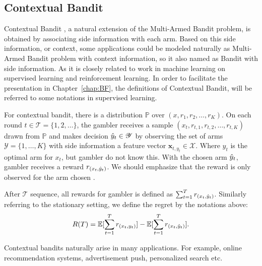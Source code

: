 \subsection{Contextual Bandit}
\label{subsec:contextual}

Contextual Bandit \cite{agrawal2012thompson,may2012optimistic}, a natural extension of the Multi-Armed Bandit problem, is obtained by associating side information with each arm. Based on this side information, or context, some applications could be modeled naturally as Multi-Armed Bandit problem with context information, so it also named as Bandit with side information. As it is closely related to work in machine learning on supervised learning and reinforcement learning. In order to facilitate the presentation in Chapter~\ref{chap:BF}, the definitions of Contextual Bandit, will be referred to some notations in supervised learning.

For contextual bandit, there is a distribution $\mathbb{P}$ over $(x, r_1, r_2,\dots,r_K)$. On each round $t\in \mathscr{T}=\{1, 2, \dots\}$, the gambler receives a sample $(x_t, r_{t,1},r_{t,2},\dots, r_{t,K})$ drawn from $\mathbb{P}$ and makes decision $\hat{y}_t \in \mathscr{Y}$ by observing the set of arms $\mathscr{Y} = \{1,\dots,K\}$ with side information a feature vector $\mathbf{x}_{t,y_t} \in \mathscr{X}$. Where $y_t$ is the optimal arm for $x_t$, but gambler do not know this. With the chosen arm $\hat{y}_t$, gambler receives a  reward $r_{(x_t,\hat{y}_t)}$. We should emphasize that the reward is only observed for the arm chosen . 

After $\mathscr{T}$ sequence, all rewards for gambler is defined as $\sum_{t=1}^{T}r_{(x_t,\hat{y}_t)}$. Similarly referring to the stationary setting, we define the regret by the notations above:
\[R(T) = \mathbb{E}[\sum_{t=1}^{T}r_{(x_t,y_t)}] - \mathbb{E}[\sum_{t=1}^T r_{(x_t,\hat{y}_t)}].\]

Contextual bandits naturally arise in many applications. For example, online recommendation systems, advertisement push, personalized search etc.